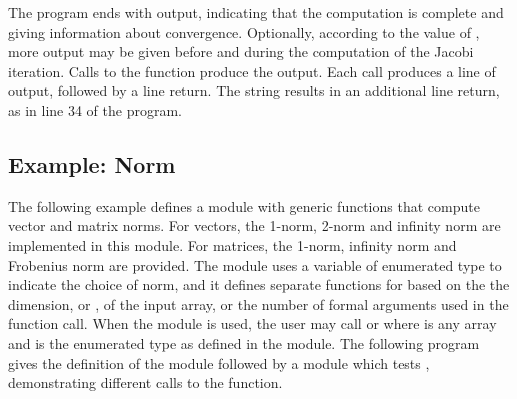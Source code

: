 The program ends with output, indicating that the computation is complete
and giving information about convergence.  Optionally, according to the
value of , more output may be given before and during the
computation of the Jacobi iteration.  Calls to the function 
produce the output.  Each  call
produces a line of output, followed by a line return.  The string 
results in  an additional line return, as in line 34 of the program.

\subsection{Example: Norm}
The following example defines a module  with generic functions 
that compute vector and matrix norms.  For vectors, the 1-norm, 2-norm
and infinity norm are implemented in this module.  For matrices, the 1-norm,
infinity norm and Frobenius norm are provided.   
The module uses a variable of enumerated type  to indicate the choice
of norm, and it defines separate functions for  based on the
the dimension, or , of the input array, or the number of formal
arguments used in the  function call.  
When the  module is used, the user may call 
 or  where
 is any array and  is the enumerated type as defined
in the  module.  
The following program gives the definition of the  module followed
by a module which tests , demonstrating different calls to the 
function.

